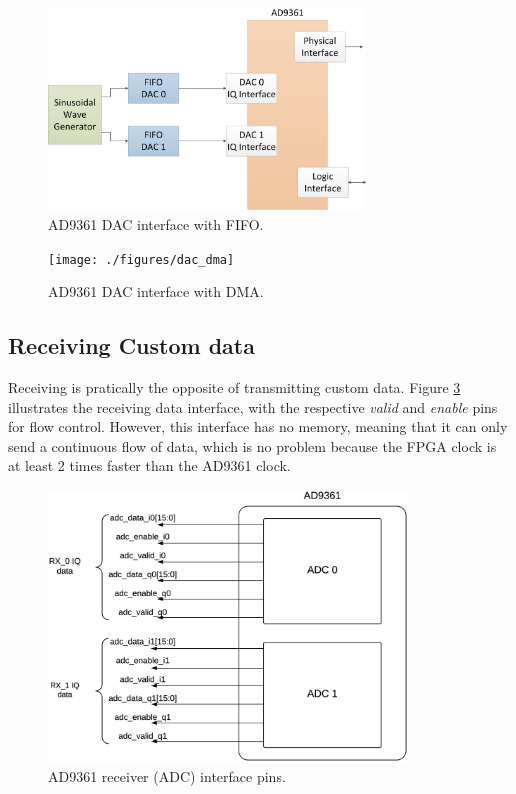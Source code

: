 \begin{figure}[htbp]
    \centering
    \includegraphics[width=0.75\textwidth]{./figures/dac_fifo}
    \caption{ AD9361 DAC interface with FIFO.
    \label{fig:ad9361txfifo}}
\end{figure}


\begin{figure}[htbp]
    \centering
    \texttt{[image: ./figures/dac\_dma]}
    \caption{ AD9361 DAC interface with DMA.
    \label{fig:ad9361txdma}}
\end{figure}

\subsection{Receiving Custom data}

Receiving is pratically the opposite of transmitting custom data. Figure
\ref{fig:rxpins} illustrates the receiving data interface, with the respective
\emph{valid} and \emph{enable} pins for flow control. However, this interface
has no memory, meaning that it can only send a continuous flow of data, which is
no problem because the FPGA clock is at least 2 times faster than the AD9361
clock.

\begin{figure}[htbp]
    \centering
    \includegraphics[width=0.85\textwidth]{./figures/ad9361rx_pins}
    \caption{ AD9361 receiver (ADC) interface pins.
    \label{fig:rxpins}}
\end{figure}

